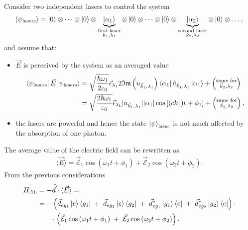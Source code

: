 Consider two independent lasers to control the system
\begin{equation*}
\ket{\psi_\text{lasers}} = \ket{0} \otimes \dots \otimes \ket{0} \otimes \underbrace{\ket{\alpha_1}}_{\substack{\textrm{first laser}\\k_1,\lambda_1}} \otimes \ket{0} \otimes \dots \otimes \ket{0} \otimes \underbrace{\ket{\alpha_2}}_{\substack{\textrm{second laser}\\k_2,\lambda_2}} \otimes \ket{0} \otimes \dots,
\end{equation*}
and assume that: 
\begin{itemize}
    \item $\vec{E}$ is perceived by the system as an averaged value
    \begin{align*}
    \bra{\psi_\text{lasers}}\vec{E}\ket{\psi_\text{lasers}} & = \sqrt{\frac{\hbar\omega_1}{2 \varepsilon_0}}
\vec\epsilon_{\lambda_1} 2 \mathfrak{Im} \left(u_{\vec{k}_1,\lambda_1}\right) \bra{\alpha_1}\hat{a}_{\vec{k}_1,\lambda_1} \ket{\alpha_1} + \left(\substack{\text{same for}\\\vec{k}_2, \lambda_2 }\right)\\ 
& = \sqrt{\frac{2\hbar\omega_1}{\varepsilon_0}}
\vec\epsilon_{\lambda_1} |u_{\vec{k}_1,\lambda_1}||\alpha_1| \cos\left[(c k_1)t + \phi_1\right] + \left(\substack{\text{same for}\\\vec{k}_2, \lambda_2 }\right),
    \end{align*}
    \item the lasers are powerful and hence the state $\ket{\psi}_\text{laser}$ is not much affected by the absorption of one photon.
\end{itemize}
The average value of the electric field can be rewritten as  
    \begin{align}
        \langle \vec{E}\rangle =
\vec{\mathcal{E}}_1 \cos\left(\omega_1t + \phi_1\right) +
\vec{\mathcal{E}}_2 \cos\left(\omega_2t + \phi_2\right). 
    \end{align}
From the previous considerations
\begin{align*}
    H_{AL} & = - \hat{\vec{d}} \cdot \langle \vec{E}\rangle = \\
    &= -\left(
    \vec{d}_{eg_1}\ket{e}\bra{g_1} \;+\; 
    \vec{d}_{eg_2}\ket{e}\bra{g_2} \;+\; 
    \vec{d}_{eg_1}^*\ket{g_1}\bra{e} \;+\; 
    \vec{d}_{eg_2}^*\ket{g_2}\bra{e}
\right)
\cdot\\
&\qquad \cdot\left(
    \vec{\mathcal{E}}_1 \cos\left(\omega_1t + \phi_1\right)
    \;+\;
    \vec{\mathcal{E}}_2 \cos\left(\omega_2t + \phi_2\right)
\right). 
\end{align*}
